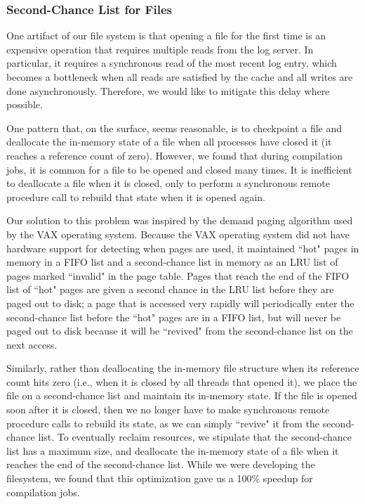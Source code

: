 \documentclass{acm_proc_article-sp}
\begin{document}
\subsubsection{Second-Chance List for Files}
One artifact of our file system is that opening a file for the first time is an expensive operation that requires multiple reads from the log server. In particular, it requires a synchronous read of the most recent log entry, which becomes a bottleneck when all reads are satisfied by the cache and all writes are done asynchronously. Therefore, we would like to mitigate this delay where possible.

One pattern that, on the surface, seems reasonable, is to checkpoint a file and deallocate the in-memory state of a file when all processes have closed it (it reaches a reference count of zero). However, we found that during compilation jobs, it is common for a file to be opened and closed many times. It is inefficient to deallocate a file when it is closed, only to perform a synchronous remote procedure call to rebuild that state when it is opened again.

Our solution to this problem was inspired by the demand paging algorithm used by the VAX operating system. Because the VAX operating system did not have hardware support for detecting when pages are used, it maintained ``hot" pages in memory in a FIFO list and a second-chance list in memory as an LRU list of pages marked ``invalid" in the page table. Pages that reach the end of the FIFO list of ``hot" pages are given a second chance in the LRU list before they are paged out to disk; a page that is accessed very rapidly will periodically enter the second-chance list before the ``hot" pages are in a FIFO list, but will never be paged out to disk because it will be ``revived" from the second-chance list on the next access.

Similarly, rather than deallocating the in-memory file structure when its reference count hits zero (i.e., when it is closed by all threads that opened it), we place the file on a second-chance list and maintain its in-memory state. If the file is opened soon after it is closed, then we no longer have to make synchronous remote procedure calls to rebuild its state, as we can simply ``revive" it from the second-chance list. To eventually reclaim resources, we stipulate that the second-chance list has a maximum size, and deallocate the in-memory state of a file when it reaches the end of the second-chance list. While we were developing the filesystem, we found that this optimization gave us a 100\% speedup for compilation jobs.
\end{document}
